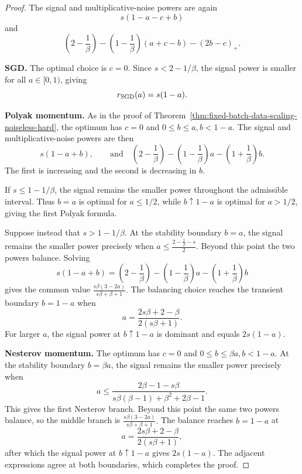 \begin{proof}
The signal and multiplicative-noise powers are again
\[
s(1-a-c+b)
\]
and
\[
\left(2-\frac1\beta\right)
-\left(1-\frac1\beta\right)(a+c-b)
-(2b-c)_{+}.
\]

\medskip

\noindent\textbf{SGD.}
The optimal choice is \(c=0\). Since \(s<2-1/\beta\), the signal power is smaller for all \(a\in[0,1)\), giving
\[
r_{\rm SGD}(a)=s(1-a).
\]

\medskip

\noindent\textbf{Polyak momentum.}
As in the proof of Theorem~\ref{thm:fixed-batch-data-scaling-noiseless-hard}, the optimum has \(c=0\) and
$0\leq b\leq a,
b<1-a.$
The signal and multiplicative-noise powers are then
\[
s(1-a+b), \qquad\text{and} \quad
\left(2-\frac1\beta\right)
-\left(1-\frac1\beta\right)a
-\left(1+\frac1\beta\right)b.
\]
The first is increasing and the second is decreasing in \(b\).

If \(s\leq1-1/\beta\), the signal remains the smaller power throughout the admissible interval. Thus \(b=a\) is optimal for \(a\leq1/2\), while \(b\uparrow1-a\) is optimal for \(a>1/2\), giving the first Polyak formula.

Suppose instead that \(s>1-1/\beta\). At the stability boundary \(b=a\), the signal remains the smaller power precisely when
\(a\leq\frac{2-\frac1\beta-s}{2}.\)
Beyond this point the two powers balance. Solving
\[
s(1-a+b)
=
\left(2-\frac1\beta\right)
-\left(1-\frac1\beta\right)a
-\left(1+\frac1\beta\right)b
\]
gives the common value
\(\frac{s\beta(3-2a)}{s\beta+\beta+1}.\)
The balancing choice reaches the transient boundary \(b=1-a\) when
\[
a=\frac{2s\beta+2-\beta}{2(s\beta+1)}.
\]
For larger \(a\), the signal power at \(b\uparrow1-a\) is dominant and equals \(2s(1-a)\).

\medskip

\noindent\textbf{Nesterov momentum.}
The optimum has \(c=0\) and
$0\leq b\leq\beta a, 
b<1-a.$
At the stability boundary \(b=\beta a\), the signal remains the smaller power precisely when
\[
a\leq
\frac{2\beta-1-s\beta}
{s\beta(\beta-1)+\beta^2+2\beta-1}.
\]
This gives the first Nesterov branch. Beyond this point the same two powers balance, so the middle branch is
\(\frac{s\beta(3-2a)}{s\beta+\beta+1}.\)
The balance reaches \(b=1-a\) at
\[
a=\frac{2s\beta+2-\beta}{2(s\beta+1)},
\]
after which the signal power at \(b\uparrow1-a\) gives \(2s(1-a)\). The adjacent expressions agree at both boundaries, which completes the proof.
\end{proof}

